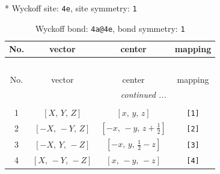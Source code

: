\documentclass[fleqn,8pt]{jsarticle}
\begin{document}
* Wyckoff site: {\tt 4e}, site symmetry: {\tt 1}
\renewcommand{\arraystretch}{1.2}
\begin{longtable}{cccc}
\caption{Wyckoff bond: {\tt 4a@4e}, bond symmetry: {\tt 1}}
 \\
 \hline \hline
No. & vector & center & mapping \\ \hline \endfirsthead

\multicolumn{3}{l}{\tablename\ \thetable{}} \\
 \hline \hline
No. & vector & center & mapping \\ \hline \endhead

 \hline \hline
\multicolumn{3}{r}{\footnotesize\it continued ...} \\ \endfoot

 \hline \hline
\multicolumn{3}{r}{} \\ \endlastfoot

1 & $\left[ X,\, Y,\, Z \right]$ & $\left[ x,\, y,\, z \right]$ & {\tt [1]} \\ \hline
2 & $\left[ - X,\, - Y,\, Z \right]$ & $\left[ - x,\, - y,\, z + \frac{1}{2} \right]$ & {\tt [2]} \\ \hline
3 & $\left[ - X,\, Y,\, - Z \right]$ & $\left[ - x,\, y,\, \frac{1}{2} - z \right]$ & {\tt [3]} \\ \hline
4 & $\left[ X,\, - Y,\, - Z \right]$ & $\left[ x,\, - y,\, - z \right]$ & {\tt [4]} \\
\end{longtable}
\end{document}
